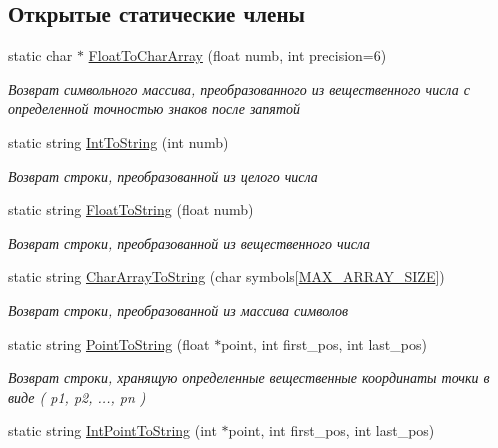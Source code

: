 \subsection*{Открытые статические члены}
\begin{DoxyCompactItemize}
\item 
static char $\ast$ \hyperlink{class_types_change_a8c84a2aa20d11c31bf9416a64e8aee10}{Float\+To\+Char\+Array} (float numb, int precision=6)
\begin{DoxyCompactList}\small\item\em Возврат символьного массива, преобразованного из вещественного числа с определенной точностью знаков после запятой \end{DoxyCompactList}\item 
static string \hyperlink{class_types_change_a7f648ce98eca5da08b991002dc6d0204}{Int\+To\+String} (int numb)
\begin{DoxyCompactList}\small\item\em Возврат строки, преобразованной из целого числа \end{DoxyCompactList}\item 
static string \hyperlink{class_types_change_a3a510e44ef4e44bb1085108650d2a266}{Float\+To\+String} (float numb)
\begin{DoxyCompactList}\small\item\em Возврат строки, преобразованной из вещественного числа \end{DoxyCompactList}\item 
static string \hyperlink{class_types_change_a3b3b728634baf3e6192824b5f1221cc5}{Char\+Array\+To\+String} (char symbols\mbox{[}\hyperlink{arithmetic_8h_a21afaf2dcbf3be6bc362d358ab3378d9}{M\+A\+X\+\_\+\+A\+R\+R\+A\+Y\+\_\+\+S\+I\+Z\+E}\mbox{]})
\begin{DoxyCompactList}\small\item\em Возврат строки, преобразованной из массива символов \end{DoxyCompactList}\item 
static string \hyperlink{class_types_change_a2f6b7c2c40aa4b8bfca016a689053673}{Point\+To\+String} (float $\ast$point, int first\+\_\+pos, int last\+\_\+pos)
\begin{DoxyCompactList}\small\item\em Возврат строки, хранящую определенные вещественные координаты точки в виде ( p1, p2, ..., pn ) \end{DoxyCompactList}\item 
static string \hyperlink{class_types_change_a3e09f3c31597ee4e584eeedf16beaf4d}{Int\+Point\+To\+String} (int $\ast$point, int first\+\_\+pos, int last\+\_\+pos)

\end{DoxyCompactItemize}

